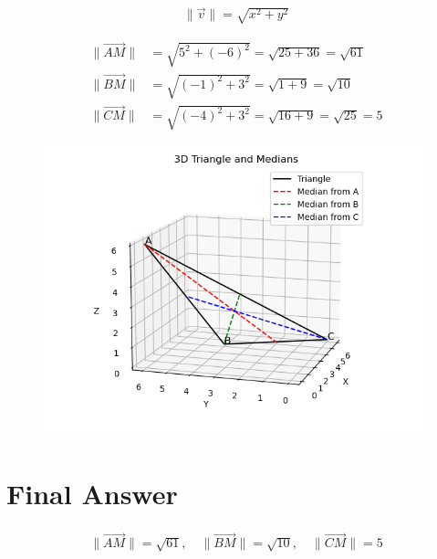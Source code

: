 \documentclass{article}
\begin{document}
\begin{align}
\|\vec{v}\| = \sqrt{x^2 + y^2}
\end{align}


\begin{align}
\|\vec{AM}\| &= \sqrt{5^2 + (-6)^2} = \sqrt{25 + 36} = \sqrt{61} \\
\|\vec{BM}\| &= \sqrt{(-1)^2 + 3^2} = \sqrt{1 + 9} = \sqrt{10} \\
\|\vec{CM}\| &= \sqrt{(-4)^2 + 3^2} = \sqrt{16 + 9} = \sqrt{25} = 5
\end{align}

\begin{figure}[H]
    \centering
    \includegraphics[width=0.75\linewidth]{figs/Figure_1.png}
    \caption{}
    \label{fig:fig1}
\end{figure}

\section*{Final Answer}


\begin{align}
\boxed{
\|\vec{AM}\| = \sqrt{61}, \quad
\|\vec{BM}\| = \sqrt{10}, \quad
\|\vec{CM}\| = 5
}
\end{align}
\end{document}
